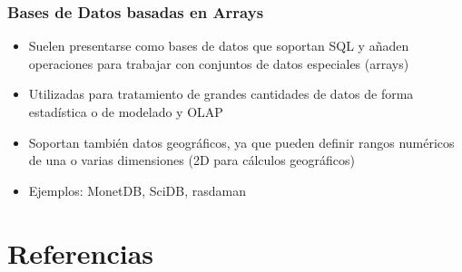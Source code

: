 \documentclass[14pt]{beamer}
\begin{document}
\begin{frame}
  \frametitle{Bases de Datos basadas en Arrays}
  \begin{itemize}
\item Suelen presentarse como bases de datos que soportan SQL y añaden
  operaciones para trabajar con conjuntos de datos especiales (arrays)
\item Utilizadas para tratamiento de grandes cantidades de datos de forma
  estadística o de modelado y OLAP
\item Soportan también datos geográficos, ya que pueden definir rangos
  numéricos de una o varias dimensiones (2D para cálculos geográficos)
\item Ejemplos: MonetDB, SciDB, rasdaman
  \end{itemize}
\end{frame}

\section{Referencias}
\end{document}
